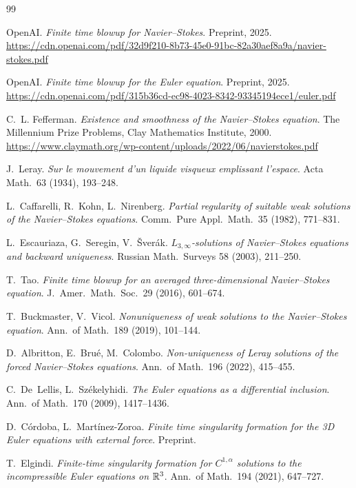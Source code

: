 \begin{thebibliography}{99}

 OpenAI. \emph{Finite time blowup for Navier--Stokes}. Preprint, 2025.
\url{https://cdn.openai.com/pdf/32d9f210-8b73-45e0-91bc-82a30aef8a9a/navier-stokes.pdf}

 OpenAI. \emph{Finite time blowup for the Euler equation}. Preprint, 2025.
\url{https://cdn.openai.com/pdf/315b36cd-ec98-4023-8342-93345194ece1/euler.pdf}

 C.~L. Fefferman. \emph{Existence and smoothness of the Navier--Stokes equation}.
The Millennium Prize Problems, Clay Mathematics Institute, 2000.
\url{https://www.claymath.org/wp-content/uploads/2022/06/navierstokes.pdf}

 J.~Leray. \emph{Sur le mouvement d'un liquide visqueux emplissant l'espace}.
Acta Math.\ 63 (1934), 193--248.

 L.~Caffarelli, R.~Kohn, L.~Nirenberg. \emph{Partial regularity of suitable weak
solutions of the Navier--Stokes equations}. Comm.\ Pure Appl.\ Math.\ 35 (1982), 771--831.

 L.~Escauriaza, G.~Seregin, V.~\v{S}ver\'ak. \emph{$L_{3,\infty}$-solutions of
Navier--Stokes equations and backward uniqueness}. Russian Math.\ Surveys 58 (2003), 211--250.

 T.~Tao. \emph{Finite time blowup for an averaged three-dimensional
Navier--Stokes equation}. J.\ Amer.\ Math.\ Soc.\ 29 (2016), 601--674.

 T.~Buckmaster, V.~Vicol. \emph{Nonuniqueness of weak solutions to the
Navier--Stokes equation}. Ann.\ of Math.\ 189 (2019), 101--144.

 D.~Albritton, E.~Bru\'e, M.~Colombo. \emph{Non-uniqueness of Leray solutions of
the forced Navier--Stokes equations}. Ann.\ of Math.\ 196 (2022), 415--455.

 C.~De~Lellis, L.~Sz\'ekelyhidi. \emph{The Euler equations as a differential
inclusion}. Ann.\ of Math.\ 170 (2009), 1417--1436.

 D.~C\'ordoba, L.~Mart\'inez-Zoroa. \emph{Finite time singularity
formation for the 3D Euler equations with external force}. Preprint.

 T.~Elgindi. \emph{Finite-time singularity formation for $C^{1,\alpha}$
solutions to the incompressible Euler equations on $\mathbb{R}^3$}. Ann.\ of Math.\ 194 (2021),
647--727.


\end{thebibliography}
